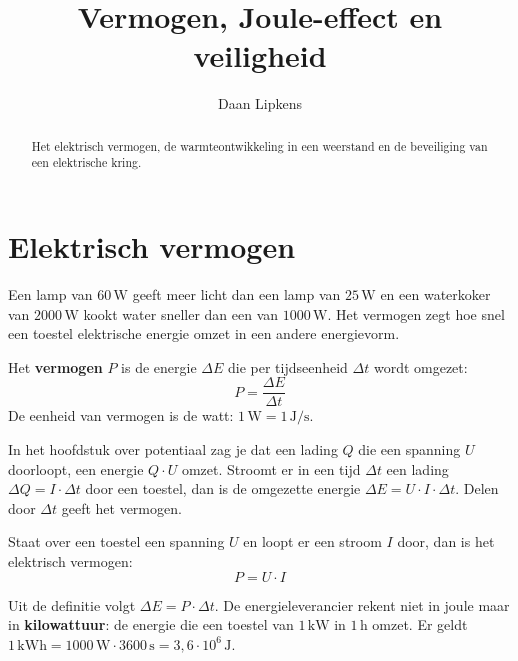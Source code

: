 \documentclass{ximera}
\title{Vermogen, Joule-effect en veiligheid}
\author{Daan Lipkens}
\begin{document}
\begin{abstract}
    Het elektrisch vermogen, de warmteontwikkeling in een weerstand en de beveiliging van een elektrische kring.
\end{abstract}
\maketitle
\label{ond:schakelingen_vermogen}

\section{Elektrisch vermogen}\label{sec:vermogen}
Een lamp van $60\,\mathrm{W}$ geeft meer licht dan een lamp van $25\,\mathrm{W}$ en een waterkoker van $2000\,\mathrm{W}$ kookt water sneller dan een van $1000\,\mathrm{W}$. Het vermogen zegt hoe snel een toestel elektrische energie omzet in een andere energievorm.

\begin{definition}[foldable=true,title={Vermogen}]\nl
    Het \textbf{vermogen} $P$ is de energie $\Delta E$ die per tijdseenheid $\Delta t$ wordt omgezet:
    \begin{equation*}
        P = \frac{\Delta E}{\Delta t}
    \end{equation*}
    De eenheid van vermogen is de watt: $1\,\mathrm{W} = 1\,\mathrm{J/s}$.
\end{definition}

In het hoofdstuk over potentiaal zag je dat een lading $Q$ die een spanning $U$ doorloopt, een energie $Q \cdot U$ omzet. Stroomt er in een tijd $\Delta t$ een lading $\Delta Q = I \cdot \Delta t$ door een toestel, dan is de omgezette energie $\Delta E = U \cdot I \cdot \Delta t$. Delen door $\Delta t$ geeft het vermogen.

\begin{proposition}[title={Elektrisch vermogen}]\nl
    Staat over een toestel een spanning $U$ en loopt er een stroom $I$ door, dan is het elektrisch vermogen:
    \begin{equation}\label{eq:vermogen}
        P = U \cdot I
    \end{equation}
\end{proposition}

\begin{remark}[foldable=true,title={Energie en kilowattuur}]\nl
    Uit de definitie volgt $\Delta E = P \cdot \Delta t$. De energieleverancier rekent niet in joule maar in \textbf{kilowattuur}: de energie die een toestel van $1\,\mathrm{kW}$ in $1\,\mathrm{h}$ omzet. Er geldt $1\,\mathrm{kWh} = 1000\,\mathrm{W} \cdot 3600\,\mathrm{s} = 3{,}6 \cdot 10^{6}\,\mathrm{J}$.
\end{remark}
\end{document}
